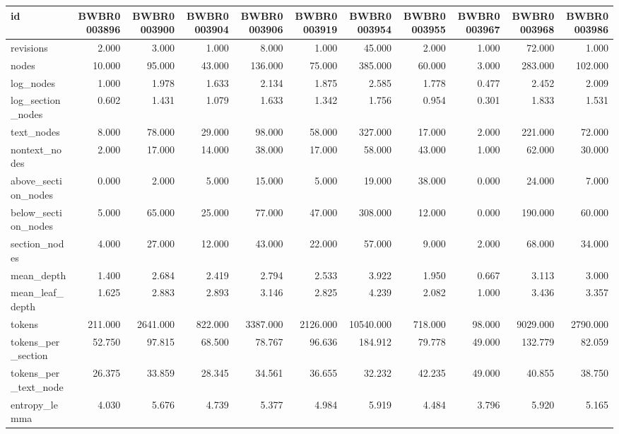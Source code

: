 \begin{tabular}{lrrrrrrrrrr}
\toprule
id & BWBR0003896 & BWBR0003900 & BWBR0003904 & BWBR0003906 & BWBR0003919 & BWBR0003954 & BWBR0003955 & BWBR0003967 & BWBR0003968 & BWBR0003986 \\
\midrule
revisions & 2.000 & 3.000 & 1.000 & 8.000 & 1.000 & 45.000 & 2.000 & 1.000 & 72.000 & 1.000 \\
\cline{1-11}
nodes & 10.000 & 95.000 & 43.000 & 136.000 & 75.000 & 385.000 & 60.000 & 3.000 & 283.000 & 102.000 \\
\cline{1-11}
log\_nodes & 1.000 & 1.978 & 1.633 & 2.134 & 1.875 & 2.585 & 1.778 & 0.477 & 2.452 & 2.009 \\
\cline{1-11}
log\_section\_nodes & 0.602 & 1.431 & 1.079 & 1.633 & 1.342 & 1.756 & 0.954 & 0.301 & 1.833 & 1.531 \\
\cline{1-11}
text\_nodes & 8.000 & 78.000 & 29.000 & 98.000 & 58.000 & 327.000 & 17.000 & 2.000 & 221.000 & 72.000 \\
\cline{1-11}
nontext\_nodes & 2.000 & 17.000 & 14.000 & 38.000 & 17.000 & 58.000 & 43.000 & 1.000 & 62.000 & 30.000 \\
\cline{1-11}
above\_section\_nodes & 0.000 & 2.000 & 5.000 & 15.000 & 5.000 & 19.000 & 38.000 & 0.000 & 24.000 & 7.000 \\
\cline{1-11}
below\_section\_nodes & 5.000 & 65.000 & 25.000 & 77.000 & 47.000 & 308.000 & 12.000 & 0.000 & 190.000 & 60.000 \\
\cline{1-11}
section\_nodes & 4.000 & 27.000 & 12.000 & 43.000 & 22.000 & 57.000 & 9.000 & 2.000 & 68.000 & 34.000 \\
\cline{1-11}
mean\_depth & 1.400 & 2.684 & 2.419 & 2.794 & 2.533 & 3.922 & 1.950 & 0.667 & 3.113 & 3.000 \\
\cline{1-11}
mean\_leaf\_depth & 1.625 & 2.883 & 2.893 & 3.146 & 2.825 & 4.239 & 2.082 & 1.000 & 3.436 & 3.357 \\
\cline{1-11}
tokens & 211.000 & 2641.000 & 822.000 & 3387.000 & 2126.000 & 10540.000 & 718.000 & 98.000 & 9029.000 & 2790.000 \\
\cline{1-11}
tokens\_per\_section & 52.750 & 97.815 & 68.500 & 78.767 & 96.636 & 184.912 & 79.778 & 49.000 & 132.779 & 82.059 \\
\cline{1-11}
tokens\_per\_text\_node & 26.375 & 33.859 & 28.345 & 34.561 & 36.655 & 32.232 & 42.235 & 49.000 & 40.855 & 38.750 \\
\cline{1-11}
entropy\_lemma & 4.030 & 5.676 & 4.739 & 5.377 & 4.984 & 5.919 & 4.484 & 3.796 & 5.920 & 5.165 \\

\end{tabular}
